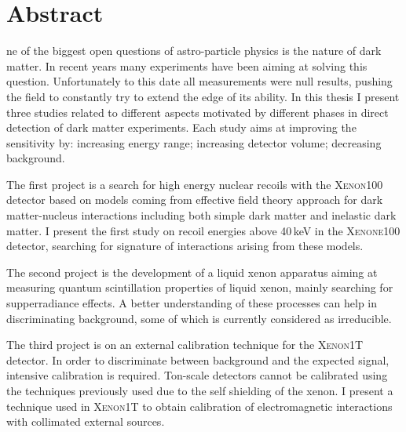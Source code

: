 %
%
%

\chapter*{Abstract}
\begin{SingleSpace}
ne of the biggest open questions of astro-particle physics is the nature of dark matter. In recent years many experiments have been aiming at solving this question. Unfortunately to this date all measurements were null results, pushing the field to constantly try to extend the edge of its ability.
In this thesis I present three studies related to different aspects motivated by  different phases in direct detection of dark matter experiments. Each study aims at improving the sensitivity by: increasing energy range; increasing detector volume; decreasing background.

The first project is a search for high energy nuclear recoils with the \textsc{Xenon100} detector based on models coming from effective field theory approach for dark matter-nucleus interactions including both simple dark matter and inelastic dark matter. I present the first study on recoil energies above 40\,keV in the \textsc{Xenone100} detector, searching for signature of interactions arising from these models.

The second project is the development of a liquid xenon apparatus aiming at measuring quantum scintillation properties of liquid xenon, mainly searching for supperradiance effects. A better understanding of these processes can help in discriminating background, some of which is currently considered as irreducible.

The third project is on an external calibration technique for the \textsc{Xenon1T} detector. In order to discriminate between background and the expected signal, intensive calibration is required. Ton-scale detectors cannot be calibrated using the techniques previously used due to the self shielding of the xenon. I present a technique used in \textsc{Xenon1T} to obtain calibration of electromagnetic interactions with collimated external sources. 



\end{SingleSpace}
\clearpage